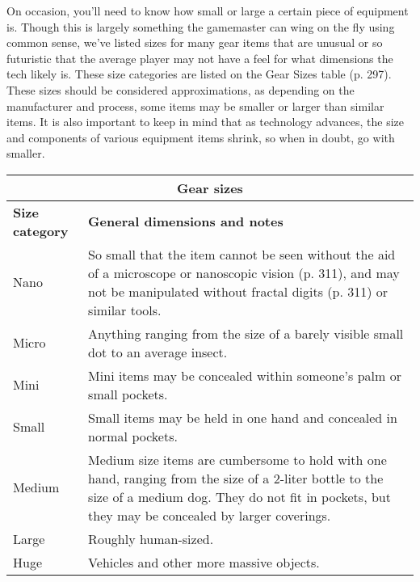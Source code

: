 On occasion, you’ll need to know how small or large a certain piece of equipment is. Though this is largely something the gamemaster can wing on the fly using common sense, we’ve listed sizes for many gear items that are unusual or so futuristic that the average player may not have a feel for what dimensions the tech likely is. These size categories are listed on the Gear Sizes table (p. 297). These sizes should be considered approximations, as depending on the manufacturer and process, some items may be smaller or larger than similar items. It is also important to keep in mind that as technology advances, the size and components of various equipment items shrink, so when in doubt, go with smaller. 



\begin{table} \begin{tabularx}{\textwidth}{|l|X|} \hline

\multicolumn{2}{|c|}{\textbf{Gear sizes}}	\\ \hline

\textbf{Size category}	&\textbf{General dimensions and notes} \\ Nano	&So small that the item cannot be seen without the aid of a microscope or nanoscopic vision (p. 311), and may not be manipulated without fractal digits (p. 311) or similar tools. \\ \hline

Micro	&Anything ranging from the size of a barely visible small dot to an average insect. \\ \hline

Mini	&Mini items may be concealed within someone’s palm or small pockets. \\ \hline

Small	&Small items may be held in one hand and concealed in normal pockets.\\ \hline

Medium	&Medium size items are cumbersome to hold with one hand, ranging from the size of a 2-liter bottle to the size of a medium dog. They do not fit in pockets, but they may be concealed by larger coverings. \\ \hline

Large	&Roughly human-sized. \\ \hline

Huge	&Vehicles and other more massive objects. \\ \hline

\end{tabularx} \label{tab:gear-sizes} \end{table} 



